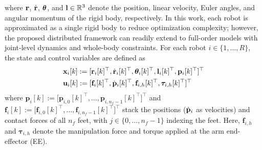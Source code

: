 where $\mathbf{r}$, $\dot{\mathbf{r}}$, $\bm{\theta}$, and $\mathbf{l} \in \mathbb{R}^3$ denote the position, linear velocity, Euler angles, and angular momentum of the rigid body, respectively. In this work, each robot is approximated as a single rigid body to reduce optimization complexity; however, the proposed distributed framework can readily extend to full-order models with joint-level dynamics and whole-body constraints. For each robot $i \in \{1,\dots,R\}$, the state and control variables are defined as
\begin{equation}
    \begin{aligned}
        & \mathbf{x}_{i}[k] := [\mathbf{r}_{i}[k]^{\top}, \dot{\mathbf{r}}_{i}[k]^{\top}, \bm{\theta}_{i}[k]^{\top}, \mathbf{l}_{i}[k]^{\top}, \mathbf{p}_{i}[k]^{\top}]^{\top}\\
        & \mathbf{u}_{i}[k] := [\mathbf{f}_{i}[k]^{\top}, \dot{\mathbf{p}}_{i}[k]^{\top}, \mathbf{f}_{i,h}[k]^{\top}, \bm{\tau}_{i,h}[k]^{\top}]^{\top}
    \end{aligned}
\end{equation}
where $\mathbf{p}_i[k] := \big[\mathbf{p}_{i,0}[k]^\top,\dots,\mathbf{p}_{i,n_f-1}[k]^\top\big]^\top$ and $\mathbf{f}_i[k] := \big[\mathbf{f}_{i,0}[k]^\top,\dots,\mathbf{f}_{i,n_f-1}[k]^\top\big]^\top$ 
stack the positions ($\dot{\mathbf{p}}_i$ as velocities) and contact forces of all $n_f$ feet, 
with $j \in \{0,\dots,n_f-1\}$ indexing the feet. 
Here, $\mathbf{f}_{i,h}$ and $\boldsymbol{\tau}_{i,h}$ denote the manipulation force and torque applied at the arm end-effector (EE).

